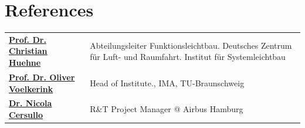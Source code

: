 \documentclass[a4paper,20pt]{article}
\begin{document}
\section{\color{blue}References}

\begin{tabular}{@{} p{6cm} p{10cm}@{}}
\textbf{\href{https://www.dlr.de/de/sy/ueber-uns/abteilungen-dlr-sy/dlr-sy-funktionsleichtbau}{Prof. Dr. Christian Huehne}} & Abteilungsleiter Funktionsleichtbau. Deutsches Zentrum für Luft- und Raumfahrt. Institut für Systemleichtbau \\
\textbf{\href{https://www.tu-braunschweig.de/ima/team/head-of-institute/prof-dr-ing-oliver-voelkerink}{Prof. Dr. Oliver Voelkerink}} & Head of Institute., IMA, TU-Braunschweig\\
\textbf{\href{https://www.linkedin.com/in/nicola-cersullo-41772b131 }{
Dr. Nicola Cersullo}} & R\&T Project Manager @ Airbus Hamburg \\
\end{tabular}
\end{document}
